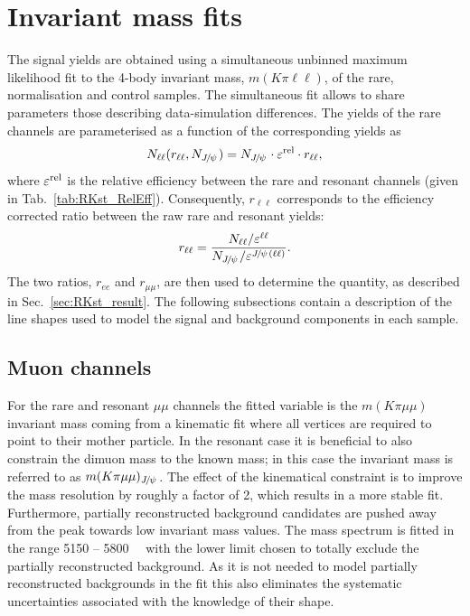 \section{Invariant mass fits}
\label{sec:rkst_fits}

The signal yields are obtained using a simultaneous unbinned maximum likelihood fit
to the 4-body invariant mass, $m(K\pi\ell\ell)$, of the rare, normalisation and control samples.
The simultaneous fit allows to share parameters \eg those describing data-simulation differences.
The yields of the rare channels are parameterised as a function of the corresponding \jpsi yields as
%
\begin{equation}
N_{\ell\ell}(r_{\ell\ell}, N_{\jpsi}) = N_{\jpsi} \cdot \varepsilon^{\rm rel} \cdot r_{\ell\ell},
\end{equation}
%
where $\varepsilon^{\rm rel}$ is the relative efficiency between the rare and resonant channels
(given in Tab.~\ref{tab:RKst_RelEff}). Consequently, $r_{\ell\ell}$ corresponds to the efficiency corrected
ratio between the raw rare and resonant yields:
%
\begin{equation}
r_{\ell\ell} = \frac{N_{\ell\ell} / \varepsilon^{\ell\ell}}{N_{\jpsi} / \varepsilon^{\jpsi(\ell\ell)}}.
\end{equation}
%
The two ratios, $r_{ee}$ and $r_{\mu\mu}$, are then used to determine
the \RKst quantity, as described in Sec.~\ref{sec:RKst_result}.
The following subsections contain a description of the line shapes used to model
the signal and background components in each sample.

\subsection{Muon channels}

For the rare and resonant $\mu\mu$ channels the fitted variable is the $m(K\pi \mu\mu)$ invariant mass coming
from a kinematic fit where all vertices are required to point to their mother particle.
In the resonant case it is beneficial to also constrain the dimuon mass to the known \jpsi mass;
in this case the invariant mass is referred to as $m(K\pi \mu\mu)_\jpsi$.
The effect of the kinematical constraint is to improve the mass resolution by roughly a factor of 2, which results
in a more stable fit. Furthermore, partially reconstructed background candidates are pushed away from
the \Bz peak towards low invariant mass values. %
The mass spectrum is fitted in the range 5150 -- 5800~\mevcc~ with the lower limit
chosen to totally exclude the partially reconstructed background.
As it is not needed to model partially reconstructed backgrounds in the fit this also
eliminates the systematic uncertainties associated with the knowledge of their shape. 

